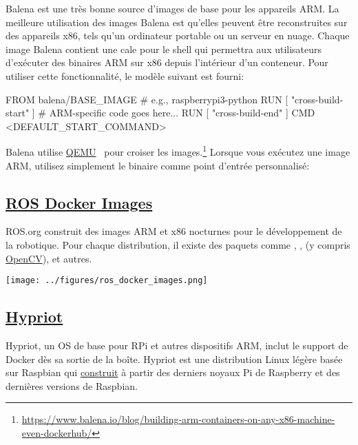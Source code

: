 Balena est une très bonne source d'images de base pour les appareils ARM. La meilleure utilisation des images Balena est qu'elles peuvent être reconstruites sur des appareils x86, tels qu'un ordinateur portable ou un serveur en nuage. Chaque image Balena contient une cale pour le shell qui permettra aux utilisateurs d'exécuter des binaires ARM sur x86 depuis l'intérieur d'un conteneur. Pour utiliser cette fonctionnalité, le modèle  suivant est fourni:
%
\begin{dockerlisting}
FROM balena/BASE_IMAGE # e.g., raspberrypi3-python
RUN [ "cross-build-start" ]
# ARM-specific code goes here...
RUN [ "cross-build-end" ]
CMD <DEFAULT_START_COMMAND>
\end{dockerlisting}
%
Balena utilise \href{https://www.qemu.org/}{QEMU}~\citep{bellard2005qemu} pour croiser les images.\hspace{-.08em}\footnote{\url{https://www.balena.io/blog/building-arm-containers-on-any-x86-machine-even-dockerhub/}} Lorsque vous exécutez une image ARM, utilisez simplement le binaire  comme point d'entrée personnalisé:
%

\subsection{\href{https://hub.docker.com/_/ros}{ROS Docker Images}}

ROS.org construit des images ARM et x86 nocturnes pour le développement de la robotique. Pour chaque distribution, il existe des paquets comme , ,  (y compris \href{https://opencv.org/}{OpenCV}),  et autres.\\
%
\begin{centering}
\texttt{[image: ../figures/ros\_docker\_images.png]}
\end{centering}

\subsection{\href{https://blog.hypriot.com/}{Hypriot}}\label{subsec:hypriot}

Hypriot, un OS de base pour RPi et autres dispositifs ARM, inclut le support de Docker dès sa sortie de la boîte. Hypriot est une distribution Linux légère basée sur Raspbian qui \href{https://github.com/hypriot/image-builder-rpi}{construit} à partir des derniers noyaux Pi de Raspberry et des dernières versions de Raspbian.


